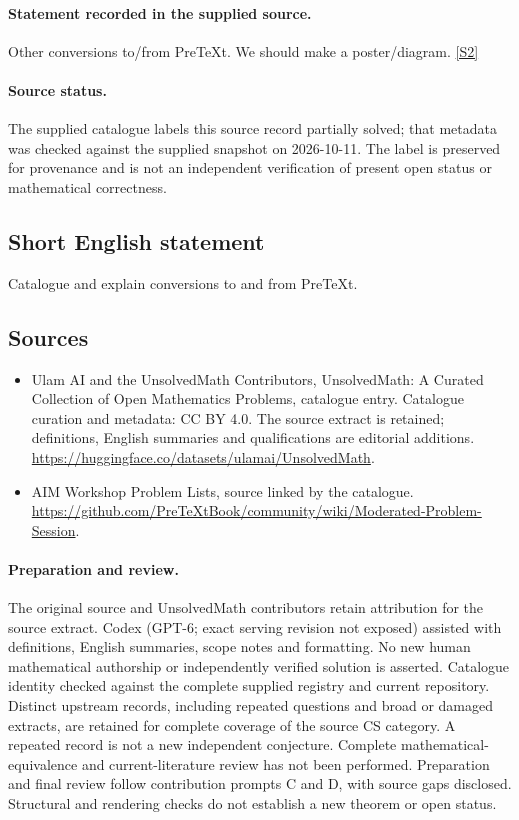 \documentclass[11pt]{article}
\begin{document}
\paragraph{Statement recorded in the supplied source.}
Other conversions to/from PreTeXt. We should make a poster/diagram. \href{https://github.com/PreTeXtBook/community/wiki/Moderated-Problem-Session}{[S2]}
\paragraph{Source status.}
The supplied catalogue labels this source record partially solved; that metadata was checked against the supplied snapshot on 2026-10-11. The label is preserved for provenance and is not an independent verification of present open status or mathematical correctness.
\subsection{Short English statement}
Catalogue and explain conversions to and from PreTeXt.
\subsection{Sources}
\begin{itemize}
\item[S1] Ulam AI and the UnsolvedMath Contributors, UnsolvedMath: A Curated Collection of Open Mathematics Problems, catalogue entry. Catalogue curation and metadata: CC BY 4.0. The source extract is retained; definitions, English summaries and qualifications are editorial additions.
\url{https://huggingface.co/datasets/ulamai/UnsolvedMath}.
\item[S2] AIM Workshop Problem Lists, source linked by the catalogue.
\url{https://github.com/PreTeXtBook/community/wiki/Moderated-Problem-Session}.
\end{itemize}
\paragraph{Preparation and review.}
The original source and UnsolvedMath contributors retain attribution for the source extract. Codex (GPT-6; exact serving revision not exposed) assisted with definitions, English summaries, scope notes and formatting. No new human mathematical authorship or independently verified solution is asserted. Catalogue identity checked against the complete supplied registry and current repository. Distinct upstream records, including repeated questions and broad or damaged extracts, are retained for complete coverage of the source CS category. A repeated record is not a new independent conjecture. Complete mathematical-equivalence and current-literature review has not been performed. Preparation and final review follow contribution prompts C and D, with source gaps disclosed. Structural and rendering checks do not establish a new theorem or open status.
\label{end:statement}
\end{document}
